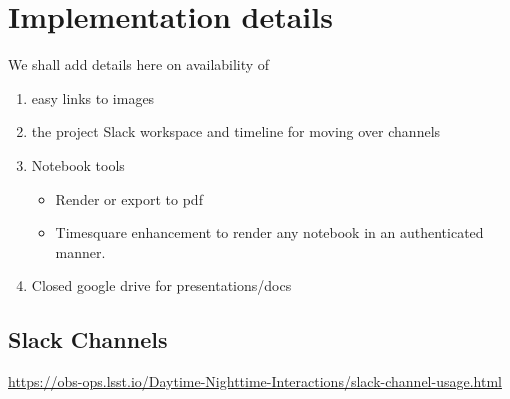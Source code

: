 \section{Implementation details} \label{sec:implementation}

We shall add details here on availability of

\begin{enumerate}
\item easy links to images
\item the project Slack workspace and timeline for moving over channels
\item Notebook tools

\begin{itemize}
\item Render or export to pdf
\item Timesquare enhancement to render any notebook in an authenticated manner.

\end{itemize}
\item Closed google drive for presentations/docs
\end{enumerate}

\subsection{Slack Channels}
\url{https://obs-ops.lsst.io/Daytime-Nighttime-Interactions/slack-channel-usage.html}

